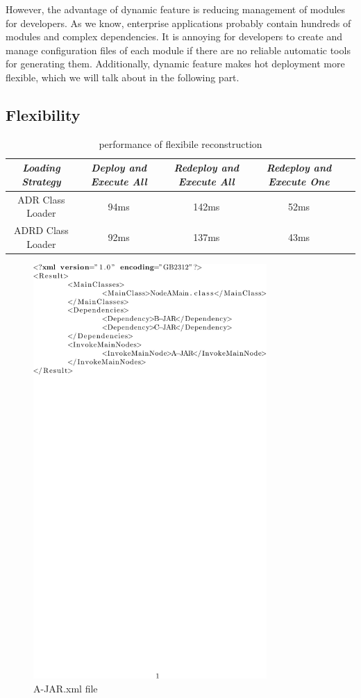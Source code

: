 \documentclass[conference]{IEEEtran}
\begin{document}
However, the advantage of dynamic feature is reducing management of modules for developers.
As we know, enterprise applications probably contain hundreds of modules and complex dependencies.
It is annoying for developers to create and manage configuration files of each module if there are no reliable automatic tools for generating them.
Additionally, dynamic feature makes hot deployment more flexible, which we will talk about in the following part.


\subsection{Flexibility}

\begin{table}
\centering
\caption{performance of flexibile reconstruction}
\label{tab:flexibility}
\begin{tabular}{|c|c|c|c|c|}
\hline
\emph{Loading Strategy}	& \emph{Deploy and Execute All}	& \emph{Redeploy and Execute All} & \emph{Redeploy and Execute One}\\
\hline
\hline
ADR Class Loader 	&	94ms				&	142ms				&	52ms\\
\hline
ADRD Class Loader 	&	92ms				&	137ms				&	43ms\\
\hline
\end{tabular}
\end{table}

\begin{figure}[!t]
\centering
\includegraphics[width=3.5in]{xmlpicture.pdf}
\caption{A-JAR.xml file}
\label{fig:xml_pic}
\end{figure}
\end{document}
